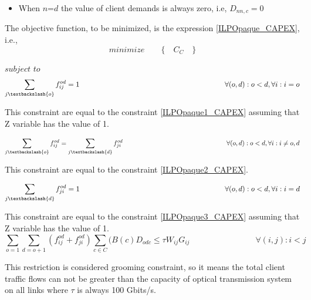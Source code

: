 \begin{itemize}
  \item When $n$=$d$ the value of client demands is always zero, i.e, $D_{nn,c}=0$
\end{itemize}


\vspace{17pt}
The objective function, to be minimized, is the expression \ref{ILPOpaque_CAPEX}, i.e.,
\begin{equation*}
  minimize \qquad \Big\{ \quad C_C \quad \Big\}
\end{equation*}

$subject$ $to$
\begin{equation}
\sum_{j\textbackslash \{o\}} f_{ij}^{od} = 1  \qquad \qquad \qquad \qquad \qquad \qquad \qquad \qquad \qquad \qquad
\forall(o,d) : o < d, \forall i: i = o
\label{ILPOpaque1_Surv}
\end{equation}

This constraint are equal to the constraint \ref{ILPOpaque1_CAPEX} assuming that Z variable has the value of 1.

\begin{equation}
\sum_{j\textbackslash \{o\}} f_{ij}^{od} = \sum_{j\textbackslash \{d\}} f_{ji}^{od}   \qquad \qquad \qquad \qquad \qquad \qquad \qquad \qquad
\forall(o,d) : o < d, \forall i: i \neq o,d
\label{ILPOpaque2_Surv}
\end{equation}

This constraint are equal to the constraint \ref{ILPOpaque2_CAPEX}.

\begin{equation}
\sum_{j\textbackslash \{d\}} f_{ji}^{od} = 1  \qquad \qquad \qquad \qquad \qquad \qquad \qquad \qquad \qquad \qquad
\forall(o,d) : o < d, \forall i: i = d
\label{ILPOpaque3_Surv}
\end{equation}

This constraint are equal to the constraint \ref{ILPOpaque3_CAPEX} assuming that Z variable has the value of 1.
\newpage
\begin{equation}
\sum_{o=1} \sum_{d=o+1} \left(f_{ij}^{od} + f_{ji}^{od}\right) \sum_{c\in C} (B\left(c\right) D_{odc}\leq \tau W_{ij} G_{ij} \qquad \qquad \qquad \qquad
\forall(i,j) : i < j
\label{ILPOpaque4_Surv}
\end{equation}

This restriction is considered grooming constraint, so it means the total client traffic flows can not be greater than the capacity of optical transmission system on all links where $\tau$ is always 100 Gbits/s.

